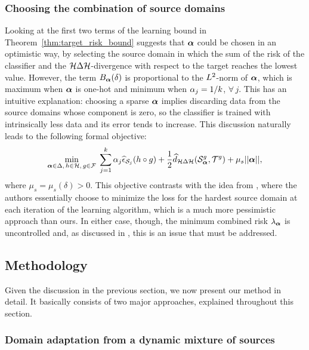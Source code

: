 \subsubsection{Choosing the combination of source domains}
\label{sec:modafm_choose_alpha}
Looking at the first two terms of the learning bound in Theorem~\ref{thm:target_risk_bound} suggests that ${\bm{\alpha}}$ could be chosen in an optimistic way, by selecting the source domain in which the sum of the risk of the classifier and the ${\mathcal{H}} \Delta {\mathcal{H}}$-divergence with respect to the target reaches the lowest value. However, the term $B_{\bm{\alpha}}(\delta)$ is proportional to the $L^2$-norm of ${\bm{\alpha}}$, which is maximum when ${\bm{\alpha}}$ is one-hot and minimum when ${\alpha}_j = 1/k$, $\forall\, j$. This has an intuitive explanation: choosing a sparse ${\bm{\alpha}}$ implies discarding data from the source domains whose component is zero, so the classifier is trained with intrinsically less data and its error tends to increase. This discussion naturally leads to the following formal objective:
\begin{equation}
    \label{eq:formal_obj}
    \min_{{\bm{\alpha}} \in \Delta, \, h\in {\mathcal{H}}, \, g \in {\mathcal{F}}}\; \sum_{j=1}^k \alpha_j\widehat{\epsilon}_{{\mathcal{S}}_j}(h \circ g) + \frac{1}{2} \widehat{d}_{{\mathcal{H}} \Delta {\mathcal{H}}}({\mathcal{S}}_{\bm{\alpha}}^g, {\mathcal{T}}^g) + \mu_s ||{\bm{\alpha}}||,
\end{equation}
where $\mu_s = \mu_s(\delta) > 0$. This objective contrasts with the idea from \citet{Zhao2018}, where the authors essentially choose to minimize the loss for the hardest source domain at each iteration of the learning algorithm, which is a much more pessimistic approach than ours. In either case, though, the minimum combined risk $\lambda_{\bm{\alpha}}$ is uncontrolled and, as discussed in , this is an issue that must be addressed.

\subsection{Methodology}
\label{sec:modafm_method}

Given the discussion in the previous section, we now present our method in detail. It basically consists of two major approaches, explained throughout this section.

\subsubsection{Domain adaptation from a dynamic mixture of sources}
\label{sec:modafm_mixture}

